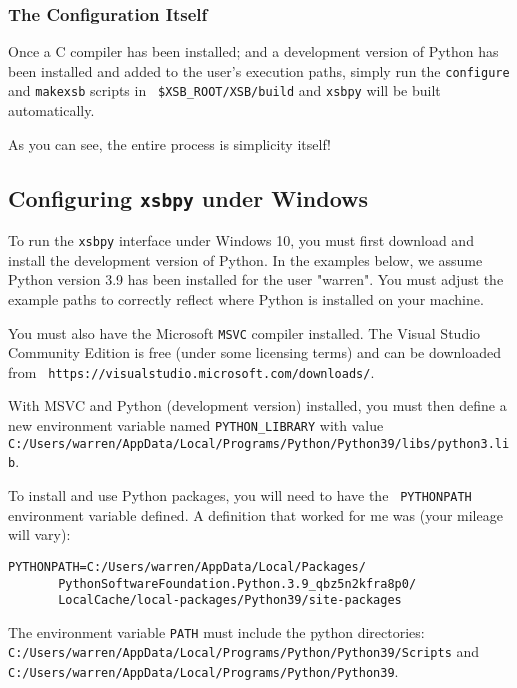 \subsubsection{The Configuration Itself}

Once a C compiler has been installed; and a development version of
Python has been installed and added to the user's execution paths,
simply run the {\tt configure} and {\tt makexsb} scripts in {\tt
  \$XSB\_ROOT/XSB/build} and {\tt xsbpy} will be built automatically.

As you can see, the entire process is simplicity itself!

\subsection{Configuring {\tt xsbpy} under Windows}

To run the {\tt xsbpy} interface under Windows 10, you must first
download and install the development version of Python.  In the
examples below, we assume Python version 3.9 has been installed for
the user "warren".  You must adjust the example paths to correctly
reflect where Python is installed on your machine.

You must also have the Microsoft {\tt MSVC} compiler installed.  The
Visual Studio Community Edition is free (under some licensing terms)
and can be downloaded from {\tt
  https://visualstudio.microsoft.com/downloads/}.

With MSVC and Python (development version) installed, you must then
define a new environment variable named {\tt PYTHON\_LIBRARY} with
value {\tt
  C:/Users/warren/AppData/Local/Programs/Python/Python39/libs/python3.lib}.

To install and use Python packages, you will need to have the {\tt
  PYTHONPATH} environment variable defined.  A definition that worked
for me was (your mileage will vary):
\begin{verbatim}
PYTHONPATH=C:/Users/warren/AppData/Local/Packages/
       PythonSoftwareFoundation.Python.3.9_qbz5n2kfra8p0/
       LocalCache/local-packages/Python39/site-packages
\end{verbatim}

The environment variable {\tt PATH} must include the python directories:\\
{\tt C:/Users/warren/AppData/Local/Programs/Python/Python39/Scripts} and\\
{\tt C:/Users/warren/AppData/Local/Programs/Python/Python39}.

